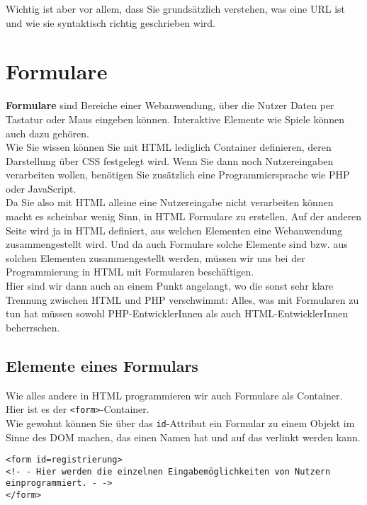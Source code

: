 Wichtig ist aber vor allem, dass Sie grundsätzlich verstehen, was eine URL ist und wie sie syntaktisch richtig geschrieben wird.

\section{Formulare}

\textbf{Formulare} sind Bereiche einer Webanwendung, über die Nutzer Daten per Tastatur oder Maus eingeben können. Interaktive Elemente wie Spiele können auch dazu gehören.\\

Wie Sie wissen können Sie mit HTML lediglich Container definieren, deren Darstellung über CSS festgelegt wird. Wenn Sie dann noch Nutzereingaben verarbeiten wollen, benötigen Sie zusätzlich eine Programmiersprache wie PHP oder JavaScript.\\

Da Sie also mit HTML alleine eine Nutzereingabe nicht verarbeiten können macht es scheinbar wenig Sinn, in HTML Formulare zu erstellen. Auf der anderen Seite wird ja in HTML definiert, aus welchen Elementen eine Webanwendung zusammengestellt wird. Und da auch Formulare solche Elemente sind bzw. aus solchen Elementen zusammengestellt werden, müssen wir uns bei der Programmierung in HTML mit Formularen beschäftigen.\\

Hier sind wir dann auch an einem Punkt angelangt, wo die sonst sehr klare Trennung zwischen HTML und PHP verschwimmt: Alles, was mit Formularen zu tun hat müssen sowohl PHP-EntwicklerInnen als auch HTML-EntwicklerInnen beherrschen.

\subsection{Elemente eines Formulars}

Wie alles andere in HTML programmieren wir auch Formulare  als Container. Hier ist es der \verb|<form>|-Container.\\

Wie gewohnt können Sie über das \verb|id|-Attribut ein Formular zu einem Objekt im Sinne des DOM machen, das einen Namen hat und auf das verlinkt werden kann.

\begin{verbatim}
<form id=registrierung>
<!- - Hier werden die einzelnen Eingabemöglichkeiten von Nutzern einprogrammiert. - ->
</form>
\end{verbatim}

